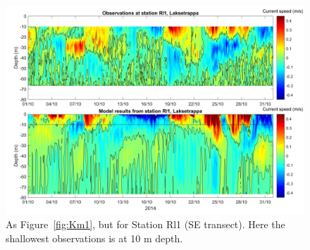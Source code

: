 \begin{figure}[htb]
	\centerline{
		\includegraphics*[trim=0 0 0 0,clip=true,width=\textwidth]{Figurer/AndreS/Rl1_Obs_vs_Mod_v2}}
	\caption{\small As Figure~\ref{fig:Km1}, but for Station Rl1 (SE transect). Here the shallowest observations is at 10 m depth.}
	\label{fig:Rl1}
\end{figure}

